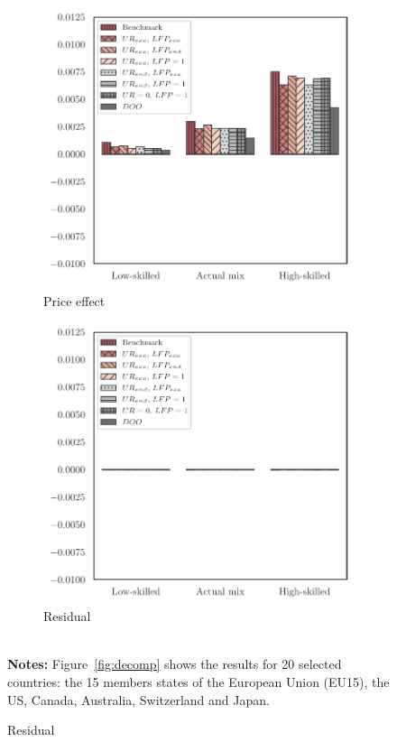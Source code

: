 \documentclass[a4paper,12pt]{article}
\begin{document}
{\begin{landscape}
\begin{center}
\begin{figure}[htb!]
\begin{subfigure}{.3\linewidth}
\end{subfigure}%
\hfill
\begin{subfigure}{.3\linewidth}
  \centering
\caption{Price effect} \label{fig:decomp_mean_P}
  \includegraphics[width=\linewidth]{graphs/qP.pdf}
\end{subfigure}
\hfill
\begin{subfigure}{.3\linewidth}
  \centering
\caption{Residual} \label{fig:decomp_mean_Resn}
  \includegraphics[width=\linewidth]{graphs/qResn.pdf}
\end{subfigure}
\\[0.5cm]
{\footnotesize \textbf{Notes:} Figure~\ref{fig:decomp} shows the results for 20 selected countries:
the 15 members states of the European Union (EU15), the US, Canada,
Australia, Switzerland and Japan.}
\end{figure}
\end{center}
\end{landscape}\restoregeometry}
\end{document}
